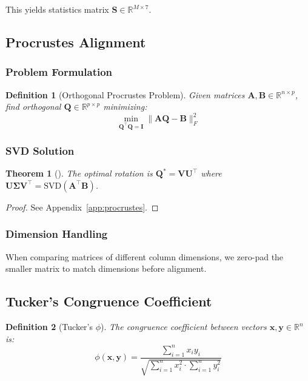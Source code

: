 \documentclass[11pt,twocolumn]{article}
\newtheorem{definition}{Definition}
\newtheorem{theorem}{Theorem}
\begin{document}
This yields statistics matrix $\mathbf{S} \in \mathbb{R}^{M \times 7}$.

\subsection{Procrustes Alignment}

\subsubsection{Problem Formulation}

\begin{definition}[Orthogonal Procrustes Problem]
Given matrices $\mathbf{A}, \mathbf{B} \in \mathbb{R}^{n \times p}$, find orthogonal $\mathbf{Q} \in \mathbb{R}^{p \times p}$ minimizing:
\begin{equation}
\min_{\mathbf{Q}^\top\mathbf{Q} = \mathbf{I}} \|\mathbf{A}\mathbf{Q} - \mathbf{B}\|_F^2
\end{equation}
\end{definition}

\subsubsection{SVD Solution}

\begin{theorem}[\citealt{schonemann1966generalized}]
The optimal rotation is $\mathbf{Q}^* = \mathbf{V}\mathbf{U}^\top$ where $\mathbf{U}\mathbf{\Sigma}\mathbf{V}^\top = \text{SVD}(\mathbf{A}^\top\mathbf{B})$.
\end{theorem}

\begin{proof}
See Appendix~\ref{app:procrustes}.
\end{proof}

\subsubsection{Dimension Handling}

When comparing matrices of different column dimensions, we zero-pad the smaller matrix to match dimensions before alignment.

\subsection{Tucker's Congruence Coefficient}

\begin{definition}[Tucker's $\phi$]
The congruence coefficient between vectors $\mathbf{x}, \mathbf{y} \in \mathbb{R}^n$ is:
\begin{equation}
\phi(\mathbf{x}, \mathbf{y}) = \frac{\sum_{i=1}^n x_i y_i}{\sqrt{\sum_{i=1}^n x_i^2 \cdot \sum_{i=1}^n y_i^2}}
\end{equation}
\end{definition}
\end{document}
